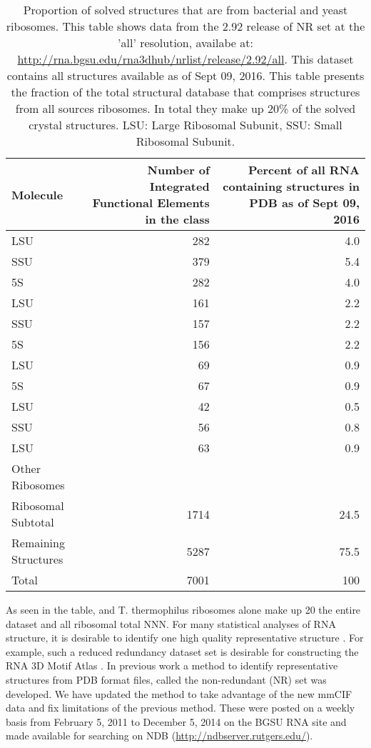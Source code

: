 \begin{table}
  \begin{tabulary}{\linewidth}{LRR}
    \toprule
    Molecule &
      Number of Integrated Functional Elements in the class &
      Percent of all RNA containing structures in PDB as of Sept 09, 2016 \\
    \midrule
    \TT{} LSU            & 282  & 4.0 \\
    \TT{} SSU            & 379  & 5.4 \\
    \TT{} 5S             & 282  & 4.0 \\
    \EC{} LSU            & 161  & 2.2 \\
    \EC{} SSU            & 157  & 2.2 \\
    \EC{} 5S             & 156  & 2.2 \\
    \HM{} LSU            & 69   & 0.9 \\
    \HM{} 5S             & 67   & 0.9 \\
    \DR{} LSU            & 42   & 0.5 \\
    \SC{} SSU            & 56   & 0.8 \\
    \SC{} LSU            & 63   & 0.9 \\
    Other Ribosomes      &      & \\
    Ribosomal Subtotal   & 1714 & 24.5 \\
    Remaining Structures & 5287 & 75.5 \\
    Total                & 7001 & 100 \\
    \bottomrule
  \end{tabulary}
  \caption{Proportion of solved structures that are from bacterial and yeast
    ribosomes. This table shows data from the 2.92 release of NR set at the
    'all' resolution, availabe at:
    \url{http://rna.bgsu.edu/rna3dhub/nrlist/release/2.92/all}. This dataset contains
    all structures available as of Sept 09, 2016. This table presents the
    fraction of the total structural database that comprises structures from all
    sources ribosomes. In total they make up 20\% of the solved crystal
  structures. LSU: Large Ribosomal Subunit, SSU: Small Ribosomal Subunit.}
  \label{tab:mol-dist}
\end{table}

As seen in the table, \EC{} and T. thermophilus ribosomes alone make up 20%
the entire dataset and all ribosomal total NNN. For many statistical analyses of
RNA structure, it is desirable to identify one high quality representative
structure \cite{Leontis2012b}. For example, such a reduced redundancy dataset
set is desirable for constructing the RNA 3D Motif Atlas \cite{Petrov2013}. In
previous work a method to identify representative structures  from PDB format
files, called the non-redundant (NR) set was developed. We have updated the
method to take advantage of the new mmCIF data and fix limitations of the
previous method. These were posted on a weekly basis from February 5, 2011 to
December 5, 2014 on the BGSU RNA site and made available for searching on NDB
(\url{http://ndbserver.rutgers.edu/}).

